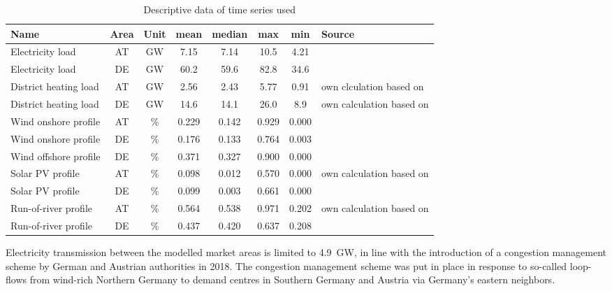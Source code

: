\documentclass[review, 3p, times]{elsarticle} %
\begin{document}
    \begin{table*}[h!t]
        \centering
        \caption{Descriptive data of time series used}\label{tab:time-series}
        \begin{tabular}{l c c c c c c l}
            \toprule
            Name & Area & Unit & mean & median & max & min & Source    \\
            \midrule
            Electricity load & AT & GW & 7.15 & 7.14 & 10.5 & 4.21 & \cite{opsd2019}      \\
            Electricity load & DE & GW & 60.2 & 59.6 & 82.8 & 34.6 & \cite{opsd2019}      \\
            District heating load & AT & GW & 2.56 & 2.43 & 5.77 & 0.91 & own clculation based on \cite{era-5, OeSTAT}\\
            District heating load & DE & GW & 14.6 & 14.1 & 26.0 & 8.9 & own calculation based on \cite{era-5, AGEB}  \\
            Wind onshore profile & AT & \%    & 0.229 & 0.142 & 0.929 & 0.000 & \cite{opsd2019}          \\
            Wind onshore profile & DE & \%    & 0.176 & 0.133 & 0.764 & 0.003 & \cite{opsd2019}          \\
            Wind offshore profile & DE & \%    & 0.371 & 0.327 & 0.900 & 0.000 & \cite{opsd2019}          \\
            Solar PV profile & AT & \%    & 0.098 & 0.012 & 0.570 & 0.000 & own calculation based on \cite{}          \\
            Solar PV profile & DE & \%    & 0.099 & 0.003 & 0.661 & 0.000 & \cite{opsd2019}          \\
            Run-of-river profile & AT & \%    & 0.564 & 0.538 & 0.971 & 0.202 & own calculation based on \cite{ENTSOE2020} \\
            Run-of-river profile & DE & \%    & 0.437 & 0.420 & 0.637 & 0.208 & \cite{ENTSOE2020} \\
            \bottomrule
        \end{tabular}
    \end{table*}


    Electricity transmission between the modelled market areas is limited to \SI{4.9}{\giga\watt}, in line with the
    introduction of a congestion management scheme by German and Austrian authorities in 2018.
    The congestion management scheme was put in place in response to so-called loop-flows from wind-rich Northern
    Germany to demand centres in Southern Germany and Austria via Germany's eastern neighbors. 
\end{document}
